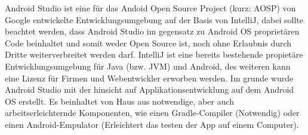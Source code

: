 Android Studio ist eine für das Andoid Open Source Project (kurz: AOSP) von Google entwickelte Entwicklungsumgebung auf der Basis von IntelliJ, dabei sollte beachtet werden, dass Android Studio im gegensatz zu Android OS
proprietären Code beinhaltet und somit weder Open Source ist, noch ohne Erlaubnis durch Dritte weiterverbreitet werden darf.
IntelliJ ist eine bereits bestehende propietäre Entwicklungsumgebung für Java (bzw. JVM) und Android, des weiteren kann eine Lizenz für Firmen und Webentwickler erworben werden.
Im grunde wurde Android Studio mit der hinsicht auf Applikationsentwicklung auf dem Android OS erstellt. Es beinhaltet von Haus aus notwendige, aber auch arbeitserleichternde Komponenten, wie
einen Gradle-Compiler (Notwendig) oder einen Android-Empulator (Erleichtert das testen der App auf einem Computer).\\

